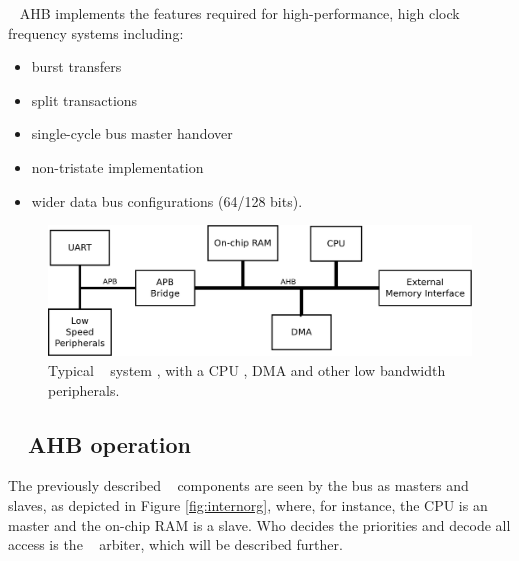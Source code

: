 \amba~ AHB implements the features required for high-performance, high clock
frequency systems including:
\begin{itemize}
 \item {burst transfers}
\item {split transactions}
\item {single-cycle bus master handover}
\item {non-tristate implementation}
\item {wider data bus configurations (64/128 bits).}
\end{itemize}

 \begin{figure}[!ht]
    \centering
    \includegraphics[width=1\textwidth]{figures/pdf/typical_amba_new.pdf}
    \caption{Typical \amba~ system , with a CPU , DMA and other low bandwidth peripherals. }
    \label{fig:general}
\end{figure}
\subsection{\amba~ AHB operation}


The previously described \amba~ components are seen by the bus as masters and slaves, as depicted in Figure \ref{fig:internorg}, where, for instance, the CPU is an \amba~ master and the on-chip RAM is a slave. Who decides the priorities and decode all access is the \amba~ arbiter, which will be described further.

